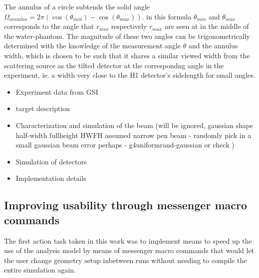 The annulus of a circle subtends the solid angle $\Omega_{annulus} = 2 \pi (\cos(\theta_{min}) - \cos(\theta_{max}))$. in this formula $\theta_{min}$ and $\theta_{max}$ corresponds to the angle that $r_{min}$ respectively $r_{max}$ are seen at in the middle of the water-phantom. The magnitude of these two angles can be trigonometrically determined with the knowledge of the measurement angle $\theta$ and the annulus width, which is chosen to be such that it shares a similar viewed width from the scattering source as the tilted detector at the correspondng angle in the experiment, ie. a width very close to the H1 detector's sidelength for small angles.







\begin{itemize}
\item Experiment data from GSI
\item target description
\item Characterization and simulation of the beam (will be ignored, gaussian shape half-width fullheight HWFH assumed narrow pen beam - randomly pick in a small gaussian beam error perhaps - g4uniformrand-gaussian or check )
\item Simulation of detectors
\item Implementation details
\end{itemize}

\subsection{Improving usability through messenger macro commands}
The first action task taken in this work was to implement means to speed up the use of the analysis model by means of messenger macro commands that would let the user change geometry setup inbetween runs without needing to compile the entire simulation again.

